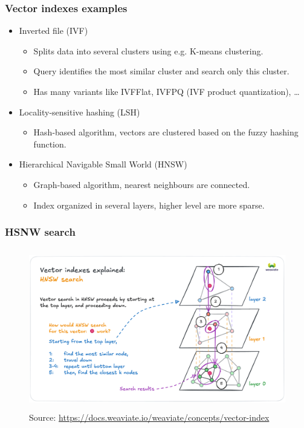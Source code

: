 \documentclass[10pt,utf8]{beamer}
\begin{document}
\begin{frame}
    \frametitle{Vector indexes examples}
    \begin{itemize}
        \item Inverted file (IVF)
            \begin{itemize}
                \item Splits data into several clusters using e.g. K-means clustering.
                \item Query identifies the most similar cluster and search only this cluster.
                \item Has many variants like IVFFlat, IVFPQ (IVF product quantization), \dots
            \end{itemize}
            \vspace{0.2cm}
        \item Locality-sensitive hashing (LSH)
            \begin{itemize}
                \item Hash-based algorithm,  vectors are clustered based on the fuzzy hashing function.
            \end{itemize}
            \vspace{0.2cm}
        \item Hierarchical Navigable Small World (HNSW)
            \begin{itemize}
                \item Graph-based algorithm, nearest neighbours are connected.
                \item Index organized in several layers, higher level are more sparse.
            \end{itemize}
    \end{itemize}
\end{frame}

\begin{frame}
    \frametitle{HSNW search}
    \vspace{-0.5cm}
    \begin{figure}
        \centering
        \includegraphics[height=7cm]{./img/hnsw_search.eps}
        \caption{\tiny{Source: \url{https://docs.weaviate.io/weaviate/concepts/vector-index}}}
    \end{figure}
\end{frame}
\end{document}
